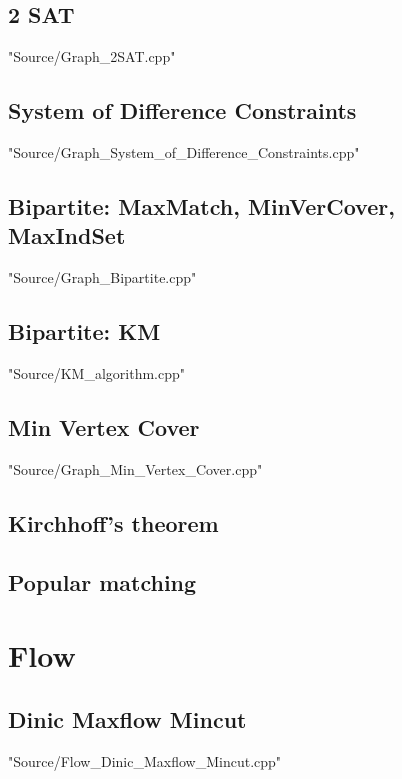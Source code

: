 \documentclass [10pt,twocolumn,oneside]{article}
\begin{document}
\subsection{2 SAT}
 {"Source/Graph_2SAT.cpp"}

\subsection{System of Difference Constraints}
 {"Source/Graph_System_of_Difference_Constraints.cpp"}

\subsection{Bipartite: MaxMatch, MinVerCover, MaxIndSet}
 {"Source/Graph_Bipartite.cpp"}

\subsection{Bipartite: KM}
 {"Source/KM_algorithm.cpp"}

\subsection{Min Vertex Cover}
 {"Source/Graph_Min_Vertex_Cover.cpp"}

\subsection{Kirchhoff's theorem}


\subsection{Popular matching}




\newpage
\section{Flow}
\subsection{Dinic Maxflow Mincut}
 {"Source/Flow_Dinic_Maxflow_Mincut.cpp"}
\end{document}
